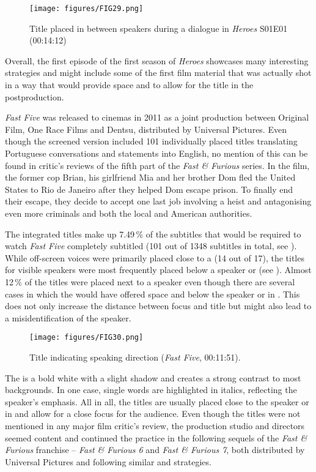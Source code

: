 \begin{figure}
\texttt{[image: figures/FIG29.png]}
\caption{Title placed in between speakers during a dialogue in \textit{Heroes} S01E01 (00:14:12)}
\label{fig:FIG29}
\end{figure}

Overall, the first episode of the first season of \textit{Heroes} showcases many interesting  strategies and might include some of the first film material that was actually shot in a way that would provide space and  to allow for the title  in the postproduction.

\textit{Fast Five} was released to cinemas in 2011 as a joint production between Original Film, One Race Films and Dentsu, distributed by Universal Pictures. Even though the screened version included 101 individually placed titles translating Portuguese conversations and statements into English, no mention of this can be found in critic’s reviews of the fifth part of the \textit{Fast \& Furious} series. In the film, the former cop Brian, his girlfriend Mia and her brother Dom fled the United States to Rio de Janeiro after they helped Dom escape prison. To finally end their escape, they decide to accept one last job involving a heist and antagonising even more criminals and both the local and American authorities.

The integrated titles make up 7.49\,\% of the subtitles that would be required to watch \textit{Fast Five} completely subtitled (101 out of 1348 subtitles in total, see ). While off-screen voices were primarily placed close to a  (14 out of 17), the titles for visible speakers were most frequently placed below a speaker or  (see ). Almost 12\,\% of the titles were placed next to a speaker even though there are several cases in which the  would have offered space and  below the speaker or in . This does not only increase the distance between focus and title but might also lead to a misidentification of the speaker.

\begin{figure}
\texttt{[image: figures/FIG30.png]}
\caption{Title indicating speaking direction (\textit{Fast Five}, 00:11:51).}
\label{fig:FIG30}
\end{figure}

The  is a bold white  with a slight shadow and creates a strong contrast to most backgrounds. In one case, single words are highlighted in italics, reflecting the speaker’s emphasis. All in all, the titles are usually placed close to the speaker or in  and allow for a close focus for the audience. Even though the titles were not mentioned in any major film critic’s review, the production studio and directors seemed content and continued the practice in the following sequels of the \textit{Fast \& Furious} franchise – \textit{Fast \& Furious 6} and \textit{Fast \& Furious 7}, both distributed by Universal Pictures and following similar  and  strategies.

